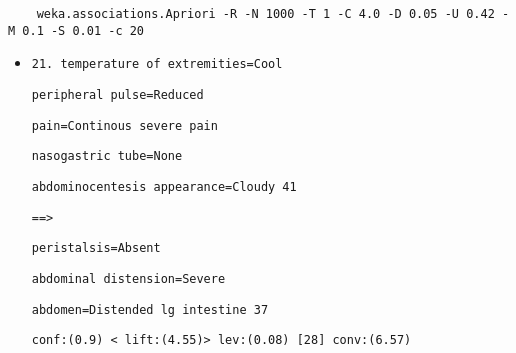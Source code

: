 \begin{verbatim}
	weka.associations.Apriori -R -N 1000 -T 1 -C 4.0 -D 0.05 -U 0.42 -M 0.1 -S 0.01 -c 20
\end{verbatim}

\begin{itemize}
\item  \verb|21. temperature of extremities=Cool|

\verb|peripheral pulse=Reduced |

\verb|pain=Continous severe pain|

\verb|nasogastric tube=None |

\verb|abdominocentesis appearance=Cloudy 41 |

\verb|==> |

\verb|peristalsis=Absent |

\verb|abdominal distension=Severe |

\verb|abdomen=Distended lg intestine 37    |

\verb|conf:(0.9) < lift:(4.55)> lev:(0.08) [28] conv:(6.57)|
\end{itemize}
